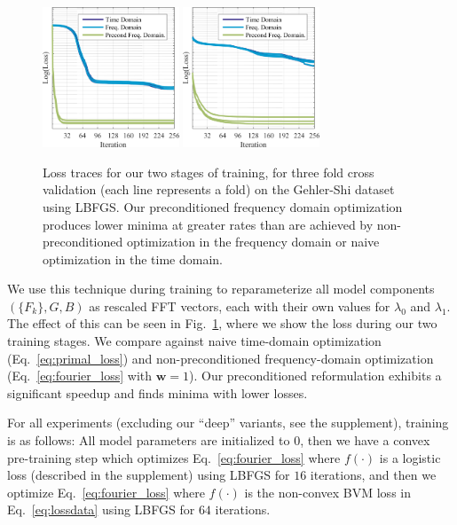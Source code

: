 \documentclass[10pt,twocolumn,letterpaper]{article}
\begin{document}
\begin{figure}[t!]
\centering
    {\includegraphics[width=1.6in]{figures/optimization_loss_1.png}}
    {\includegraphics[width=1.6in]{figures/optimization_loss_2.png}}
  \caption{
  Loss traces for our two stages of training, for three fold
  cross validation (each line represents a fold)
  on the Gehler-Shi dataset using LBFGS. Our preconditioned
  frequency domain optimization produces lower minima at greater rates
  than are achieved by non-preconditioned optimization in the
  frequency domain or naive optimization in the time domain.
  \label{fig:opt}
  }
\end{figure}

We use this technique during training to reparameterize all model
components $( \{F_k \}, G, B )$ as rescaled FFT vectors, each with their own
values for $\lambda_0$ and $\lambda_1$. The effect of this can be seen in
Fig.~\ref{fig:opt}, where we show the loss during our two training stages.
We compare against naive time-domain optimization (Eq.~\ref{eq:primal_loss})
and non-preconditioned frequency-domain optimization (Eq.~\ref{eq:fourier_loss}
with $\mathbf{w}=1$).
Our preconditioned reformulation exhibits a significant speedup and finds
minima with lower losses.

For all experiments (excluding our ``deep'' variants, see the supplement),
training is as follows:
All model parameters are initialized to $0$,
then we have a convex pre-training step which optimizes
Eq.~\ref{eq:fourier_loss} where $f(\cdot)$ is a logistic loss
(described in the supplement) using LBFGS for $16$ iterations,
and then we optimize Eq.~\ref{eq:fourier_loss}
where $f(\cdot)$ is the non-convex BVM loss in Eq.~\ref{eq:lossdata} using
LBFGS for $64$ iterations.
\end{document}
